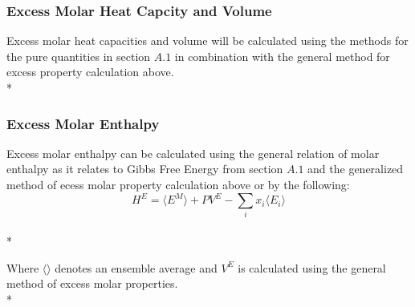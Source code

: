 \documentclass[a4paper,12pt]{article}
\begin{document}
\subsubsection{Excess Molar Heat Capcity and Volume}
\noindent Excess molar heat capacities and volume will be calculated using the  methods for the pure quantities in section $A.1$ in combination with the general method for excess property calculation above.\\*

\subsubsection{Excess Molar Enthalpy}
\noindent Excess molar enthalpy can be calculated using the general relation of molar enthalpy as it relates to Gibbs Free Energy from section $A.1$ and the generalized method of ecess molar property calculation above or by the following\cite{hexcess}:
\begin{equation}H^E = \langle E^M \rangle + P V^E - \sum_{i} x_i \langle E_i \rangle\end{equation}\\*

\noindent Where $\langle \rangle$ denotes an ensemble average and $V^E$ is calculated using the general method of excess molar properties.\\* 




\end{document}
